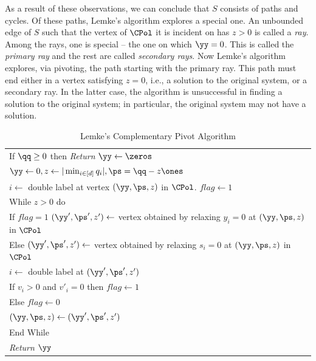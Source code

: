 As a result of these observations, we can conclude that $S$ consists of paths and cycles.  Of these paths, Lemke's algorithm
explores a special one.  An unbounded edge of $S$ such that the vertex of $\CPol$ it is incident on has $z > 0$ is called a
{\em ray}.  Among the rays, one is special -- the one on which $\yy = 0$. This is called the {\em primary ray} and the rest
are called {\em secondary rays}. Now Lemke's algorithm explores, via pivoting, the path starting with the primary ray. This
path must end either in a vertex satisfying $z = 0$, i.e., a solution to the original system, or a secondary ray. In the
latter case, the algorithm is unsuccessful in finding a solution to the original system; in particular, the original system
may not have a solution.  \medskip
\begin{table}[!htb]
\caption{Lemke's Complementary Pivot Algorithm}\label{tab:lemke}
\begin{tabular}{|l|}
\hline
\hspace{5pt} If $\qq\ge 0$ then {\em Return} $\yy\leftarrow \zeros$ \\
\hspace{5pt} $\yy\leftarrow 0, z\leftarrow |\min_{i \in [d]} q_i|, \ps=\qq-z\ones$\\
\hspace{5pt} $i\leftarrow $ double label at vertex $(\yy,\ps,z)$ in $\CPol$. $flag\leftarrow 1$ \\
\hspace{5pt} While $z>0$ do\\
\hspace{10pt} If $flag=1$ $(\yy',\ps',z')\leftarrow $ vertex obtained by relaxing $y_i=0$ at $(\yy,\ps,z)$ in $\CPol$\\
\hspace{10pt} Else $(\yy',\ps',z')\leftarrow $ vertex obtained by relaxing $s_i=0$ at $(\yy,\ps,z)$ in $\CPol$\\
\hspace{10pt} $i \leftarrow $ double label at $(\yy',\ps',z')$\\
\hspace{10pt} If $v_i>0$ and $v'_i=0$ then $flag\leftarrow 1$ \\
\hspace{10pt} Else $flag\leftarrow 0$\\
\hspace{10pt} $(\yy,\ps,z)\leftarrow(\yy',\ps',z')$\\
\hspace{5pt} End While \\
\hspace{5pt} {\em Return} $\yy$\\
\hline
\end{tabular}
\end{table}

